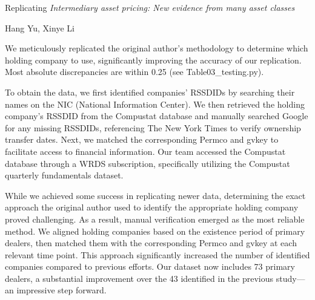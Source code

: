 {
\fontsize{12}{14}\selectfont
\textnormal{Replicating} \textit{Intermediary asset pricing: New evidence from many asset classes}
}

\bigskip

{
\fontsize{10}{12}\selectfont
Hang Yu, Xinye Li
}

We meticulously replicated the original author's methodology to determine which holding company to use, significantly improving the accuracy of our replication. Most absolute discrepancies are within 0.25 (see Table03_testing.py).

To obtain the data, we first identified companies' RSSDIDs by searching their names on the NIC (National Information Center). We then retrieved the holding company's RSSDID from the Compustat database and manually searched Google for any missing RSSDIDs, referencing The New York Times to verify ownership transfer dates. Next, we matched the corresponding Permco and gvkey to facilitate access to financial information. Our team accessed the Compustat database through a WRDS subscription, specifically utilizing the Compustat quarterly fundamentals dataset.

While we achieved some success in replicating newer data, determining the exact approach the original author used to identify the appropriate holding company proved challenging. As a result, manual verification emerged as the most reliable method. We aligned holding companies based on the existence period of primary dealers, then matched them with the corresponding Permco and gvkey at each relevant time point. This approach significantly increased the number of identified companies compared to previous efforts. Our dataset now includes 73 primary dealers, a substantial improvement over the 43 identified in the previous study—an impressive step forward.